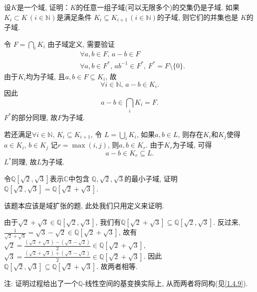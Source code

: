 \begin{problem}
    设$K$是一个域, 证明：$K$的任意一组子域(可以无限多个)的交集仍是子域.
如果$K_i \subset K \, (i \in \mathbb{N})$是满足条件
$K_i \subseteq K_{i+1} \, (i \in \mathbb{N})$的子域, 则它们的并集也是
$K$的子域.
\end{problem}

\begin{solution}
    令
\(
    F = \bigcap_i K_i
\)
    由子域定义, 需要验证
\[
\begin{aligned}
    &\forall a, b \in F ,\, a - b \in F\\
    &\forall a, b \in F^* ,\, ab^{-1} \in F^*,\, F^* = F \setminus \{0\}.
\end{aligned}
\]
由于$K_i$均为子域, 且$a, b \in F \subseteq K_i$, 故
\[
    \forall i \in \mathbb{N}, \, a - b \in K_i.
\]
因此
\[
    a - b \in \bigcap_i K_i = F.
\]
$F^*$的部分同理, 故$F$为子域.

若还满足$\forall i \in \mathbb{N} ,\, K_i \subseteq K_{i + 1}$,
令
\(
    L = \bigcup_i K_i
\),
如果$a, b \in L$, 则存在$K_i$和$K_j$使得$a \in K_i ,\, b \in K_j$
记$r = \max(i, j)$, 则$a, b \in K_r$. 由于$K_r$为子域, 可得
\[
    a - b \in K_r \subseteq L.
\]
$L^*$同理, 故$L$为子域.
\end{solution}

\begin{problem}
    令$\mathbb{Q}[\sqrt{2}, \sqrt{3}]$表示$\mathbb{C}$中包含
$\mathbb{Q}, \sqrt{2}, \sqrt{3}$的最小子域, 证明
$\mathbb{Q}[\sqrt{2}, \sqrt{3}] = \mathbb{Q}[\sqrt{2} + \sqrt{3}]$.
\end{problem}

\begin{solution}
    该题本应该是域扩张的题, 此处我们只用定义来证明.

    由于$\sqrt{2} + \sqrt{3} \in \mathbb{Q}[\sqrt{2}, \sqrt{3}]$,
我们有$\mathbb{Q}[\sqrt{2} + \sqrt{3}] \subseteq \mathbb{Q}[\sqrt{2}, \sqrt{3}]$.
反过来, 
\(
    \frac{1}{\sqrt{2} + \sqrt{3}} = \sqrt{3} - \sqrt{2} \in \mathbb{Q}[\sqrt{2} + \sqrt{3}]
\),
故有
\(
    \sqrt{2} = \frac{(\sqrt{2} + \sqrt{3}) - (\sqrt{3} - \sqrt{2})}{2} \in \mathbb{Q}[\sqrt{2} + \sqrt{3}]
\),
\(
    \sqrt{3} = \frac{(\sqrt{2} + \sqrt{3}) + (\sqrt{3} - \sqrt{2})}{2} \in \mathbb{Q}[\sqrt{2} + \sqrt{3}]
\).
因此
\(
    \mathbb{Q}[\sqrt{2}, \sqrt{3}] \subseteq \mathbb{Q}[\sqrt{2} + \sqrt{3}]
\).
故两者相等.

注: 证明过程给出了一个$\mathbb{Q}$-线性空间的基变换实际上, 从而两者将同构(见\ref{1.4.9}).
\end{solution}

